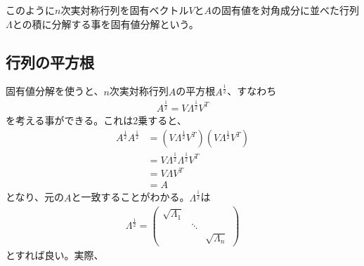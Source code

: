 このように$n$次実対称行列を固有ベクトル$V$と$A$の固有値を対角成分に並べた行列$\Lambda$との積に分解する事を固有値分解という。
\subsection{行列の平方根}
固有値分解を使うと、$n$次実対称行列$A$の平方根$\displaystyle{A^{\frac{1}{2}}}$、すなわち
\begin{align*}
  A^{\frac{1}{2}} = V \Lambda^{\frac{1}{2}} V^T
\end{align*}
を考える事ができる。これは2乗すると、
\begin{align*}
  A^{\frac{1}{2}} A^{\frac{1}{2}} & = (V \Lambda^{\frac{1}{2}} V^T) (V \Lambda^{\frac{1}{2}} V^T) \\
                                  & = V \Lambda^{\frac{1}{2}} \Lambda^{\frac{1}{2}} V^T \\
                                  & = V \Lambda V^T \\
                                  & = A
\end{align*}
となり、元の$A$と一致することがわかる。$\displaystyle{\Lambda^{\frac{1}{2}}}$は
\begin{align*}
  \Lambda^{\frac{1}{2}} = \left(
                            \begin{array}{ccc}
                              \sqrt{\Lambda_1} &        & \\
                                               & \ddots & \\
                                               &        & \sqrt{\Lambda_n}
                            \end{array}
                          \right)
\end{align*}
とすれば良い。実際、
